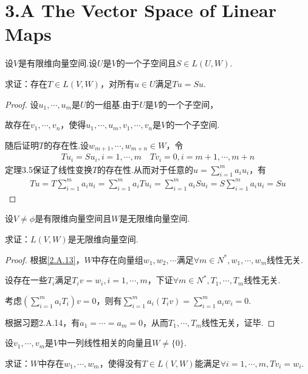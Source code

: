 \section{3.A The Vector Space of Linear Maps}

\begin{problem}[11]\label{3.A.11}
    设\(V\)是有限维向量空间.设\(U\)是\(V\)的一个子空间且\(S\in L(U,W)\).

    求证：存在\(T\in L(V,W)\)，对所有\(u\in U\)满足\(Tu=Su\).
\end{problem}

\begin{proof}
    设\(u_1,\cdots,u_m\)是\(U\)的一组基.由于\(U\)是\(V\)的一个子空间，

    故存在\(v_1,\cdots,v_n\)，使得\(u_1,\cdots,u_m,v_1,\cdots,v_n\)是\(V\)的一个子空间.

    随后证明\(T\)的存在性.设\(w_{m+1},\cdots,w_{m+n} \in W\)，令
    \begin{align*}
        Tu_i=Su_i,i=1,\cdots,m \quad Tv_i=0,i=m+1,\cdots,m+n
    \end{align*}
    定理3.5保证了线性变换\(T\)的存在性.从而对于任意的\(u=\sum_{i=1}^m a_iu_i\)，有
    \begin{align*}
        Tu=T\sum_{i=1}^m a_iu_i=\sum_{i=1}^m a_iTu_i=\sum_{i=1}^m a_iSu_i=S\sum_{i=1}^m a_iu_i=Su
    \end{align*}
\end{proof}

\begin{problem}[12]\label{3.A.12}
    设\(V \ne \phi\)是有限维向量空间且\(W\)是无限维向量空间.

    求证：\(L(V,W)\)是无限维向量空间.
\end{problem}

\begin{proof}
    根据\cref{2.A.13}，\(W\)中存在向量组\(w_1,w_2,\cdots\)满足\(\forall m \in N^*,w_1,\cdots,w_m\)线性无关.

    设存在一些\(T_i\)满足\(T_iv=w_i,i=1,\cdots,m\)，下证\(\forall m \in N^*,T_1,\cdots,T_m\)线性无关.
    
    考虑\((\sum_{i=1}^m a_iT_i)v=0\)，则有\(\sum_{i=1}^m a_i(T_iv)=\sum_{i=1}^m a_iw_i=0\).
    
    根据习题2.A.14，有\(a_1=\cdots=a_m=0\)，从而\(T_1,\cdots,T_m\)线性无关，证毕.
\end{proof}

\begin{problem}[13]\label{3.A.13}
    设\(v_1,\cdots,v_m\)是\(V\)中一列线性相关的向量且\(W \ne \{0\}\).

    求证：\(W\)中存在\(w_1,\cdots,w_m\)，使得没有\(T\in L(V,W)\)能满足\(\forall i=1,\cdots,m,Tv_i=w_i\).    
\end{problem}

